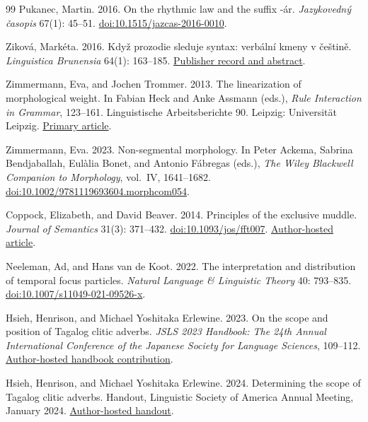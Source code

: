 \begin{thebibliography}{99}
Pukanec, Martin. 2016.
On the rhythmic law and the suffix -ár.
\textit{Jazykovedný časopis} 67(1): 45--51.
\href{https://doi.org/10.1515/jazcas-2016-0010}{doi:10.1515/jazcas-2016-0010}.

Ziková, Markéta. 2016.
Když prozodie sleduje syntax: verbální kmeny v češtině.
\textit{Linguistica Brunensia} 64(1): 163--185.
\href{https://journals.phil.muni.cz/linguistica-brunensia/article/view/31141}{Publisher record and abstract}.

Zimmermann, Eva, and Jochen Trommer. 2013.
The linearization of morphological weight.
In Fabian Heck and Anke Assmann (eds.), \textit{Rule Interaction in Grammar}, 123--161.
Linguistische Arbeitsberichte 90. Leipzig: Universität Leipzig.
\href{https://www.philol.uni-leipzig.de/fileadmin/Fakult\%C3\%A4t_Philo/Linguistik/Forschung/LAB/LAB_90/LAB90_04_evajochen.pdf}{Primary article}.

Zimmermann, Eva. 2023.
Non-segmental morphology.
In Peter Ackema, Sabrina Bendjaballah, Eulàlia Bonet, and Antonio Fábregas (eds.),
\textit{The Wiley Blackwell Companion to Morphology}, vol.~IV, 1641--1682.
\href{https://doi.org/10.1002/9781119693604.morphcom054}{doi:10.1002/9781119693604.morphcom054}.


Coppock, Elizabeth, and David Beaver. 2014.
Principles of the exclusive muddle.
\textit{Journal of Semantics} 31(3): 371--432.
\href{https://doi.org/10.1093/jos/fft007}{doi:10.1093/jos/fft007}.
\href{https://eecoppock.info/CoppockBeaver-Exclusives.pdf}{Author-hosted article}.

Neeleman, Ad, and Hans van de Koot. 2022.
The interpretation and distribution of temporal focus particles.
\textit{Natural Language \& Linguistic Theory} 40: 793--835.
\href{https://doi.org/10.1007/s11049-021-09526-x}{doi:10.1007/s11049-021-09526-x}.

Hsieh, Henrison, and Michael Yoshitaka Erlewine. 2023.
On the scope and position of Tagalog clitic adverbs.
\textit{JSLS 2023 Handbook: The 24th Annual International Conference of the
Japanese Society for Language Sciences}, 109--112.
\href{https://mitcho.com/research/clitics-jsls.pdf}{Author-hosted handbook contribution}.

Hsieh, Henrison, and Michael Yoshitaka Erlewine. 2024.
Determining the scope of Tagalog clitic adverbs.
Handout, Linguistic Society of America Annual Meeting, January 2024.
\href{https://mitcho.com/research/handout-lsa2024.pdf}{Author-hosted handout}.


\end{thebibliography}
